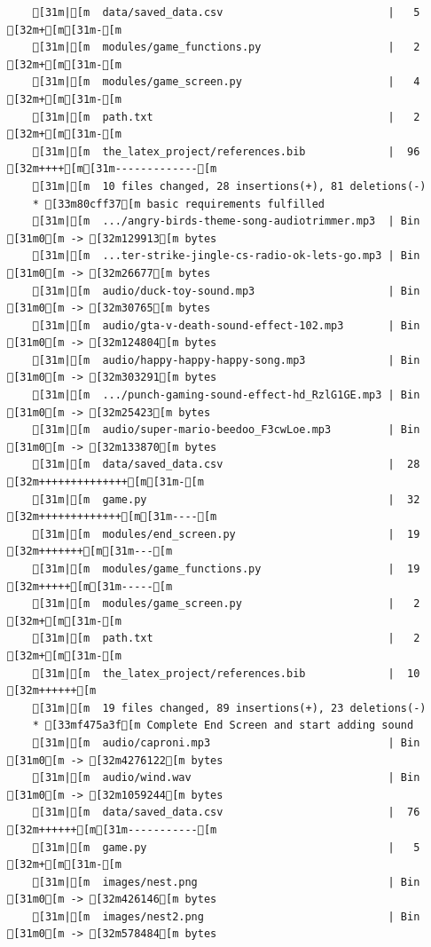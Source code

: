 \documentclass{article}
\begin{document}
{\begin{verbatim}
    [31m|[m  data/saved_data.csv                          |   5 [32m+[m[31m-[m
    [31m|[m  modules/game_functions.py                    |   2 [32m+[m[31m-[m
    [31m|[m  modules/game_screen.py                       |   4 [32m+[m[31m-[m
    [31m|[m  path.txt                                     |   2 [32m+[m[31m-[m
    [31m|[m  the_latex_project/references.bib             |  96 [32m++++[m[31m-------------[m
    [31m|[m  10 files changed, 28 insertions(+), 81 deletions(-)
    * [33m80cff37[m basic requirements fulfilled
    [31m|[m  .../angry-birds-theme-song-audiotrimmer.mp3  | Bin [31m0[m -> [32m129913[m bytes
    [31m|[m  ...ter-strike-jingle-cs-radio-ok-lets-go.mp3 | Bin [31m0[m -> [32m26677[m bytes
    [31m|[m  audio/duck-toy-sound.mp3                     | Bin [31m0[m -> [32m30765[m bytes
    [31m|[m  audio/gta-v-death-sound-effect-102.mp3       | Bin [31m0[m -> [32m124804[m bytes
    [31m|[m  audio/happy-happy-happy-song.mp3             | Bin [31m0[m -> [32m303291[m bytes
    [31m|[m  .../punch-gaming-sound-effect-hd_RzlG1GE.mp3 | Bin [31m0[m -> [32m25423[m bytes
    [31m|[m  audio/super-mario-beedoo_F3cwLoe.mp3         | Bin [31m0[m -> [32m133870[m bytes
    [31m|[m  data/saved_data.csv                          |  28 [32m++++++++++++++[m[31m-[m
    [31m|[m  game.py                                      |  32 [32m+++++++++++++[m[31m----[m
    [31m|[m  modules/end_screen.py                        |  19 [32m+++++++[m[31m---[m
    [31m|[m  modules/game_functions.py                    |  19 [32m+++++[m[31m-----[m
    [31m|[m  modules/game_screen.py                       |   2 [32m+[m[31m-[m
    [31m|[m  path.txt                                     |   2 [32m+[m[31m-[m
    [31m|[m  the_latex_project/references.bib             |  10 [32m++++++[m
    [31m|[m  19 files changed, 89 insertions(+), 23 deletions(-)
    * [33mf475a3f[m Complete End Screen and start adding sound
    [31m|[m  audio/caproni.mp3                            | Bin [31m0[m -> [32m4276122[m bytes
    [31m|[m  audio/wind.wav                               | Bin [31m0[m -> [32m1059244[m bytes
    [31m|[m  data/saved_data.csv                          |  76 [32m++++++[m[31m-----------[m
    [31m|[m  game.py                                      |   5 [32m+[m[31m-[m
    [31m|[m  images/nest.png                              | Bin [31m0[m -> [32m426146[m bytes
    [31m|[m  images/nest2.png                             | Bin [31m0[m -> [32m578484[m bytes

\end{verbatim}}
\end{document}
